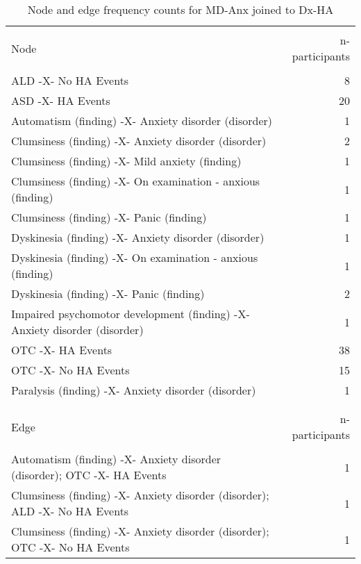 \documentclass[10pt, letterpaper]{article}
\begin{document}
\begin{spacing}{1.0}
\begin{small}
    \begin{longtable}[H]{p{5in}r}
        \caption{Node and edge frequency counts for MD-Anx joined to Dx-HA}\\
        \hline\\[-8pt]
        Node & n-participants\\
        \hline\\[-6pt]
        ALD -X- No HA Events & 8 \\
        \rowcolor{ltBlue}
        ASD -X- HA Events & 20 \\
        Automatism (finding) -X- Anxiety disorder (disorder) & 1 \\
        \rowcolor{ltBlue}
        Clumsiness (finding) -X- Anxiety disorder (disorder) & 2 \\
        Clumsiness (finding) -X- Mild anxiety (finding) & 1 \\
        \rowcolor{ltBlue}
        Clumsiness (finding) -X- On examination - anxious (finding) & 1 \\
        Clumsiness (finding) -X- Panic (finding) & 1 \\
        \rowcolor{ltBlue}
        Dyskinesia (finding) -X- Anxiety disorder (disorder) & 1 \\
        Dyskinesia (finding) -X- On examination - anxious (finding) & 1 \\
        \rowcolor{ltBlue}
        Dyskinesia (finding) -X- Panic (finding) & 2 \\
        Impaired psychomotor development (finding) -X- Anxiety disorder (disorder) & 1 \\
        \rowcolor{ltBlue}
        OTC -X- HA Events & 38 \\
        OTC -X- No HA Events & 15 \\
        \rowcolor{ltBlue}
        Paralysis (finding) -X- Anxiety disorder (disorder) & 1 \\
        &\\[-4pt]
        \hline\\[-8pt]
        Edge & n-participants\\
        \hline\\[-6pt]
        Automatism (finding) -X- Anxiety disorder (disorder); OTC -X- HA Events & 1 \\
        \rowcolor{ltBlue}
        Clumsiness (finding) -X- Anxiety disorder (disorder); ALD -X- No HA Events & 1 \\
        Clumsiness (finding) -X- Anxiety disorder (disorder); OTC -X- No HA Events & 1 \\

\end{longtable}
\end{small}
\end{spacing}
\end{document}

